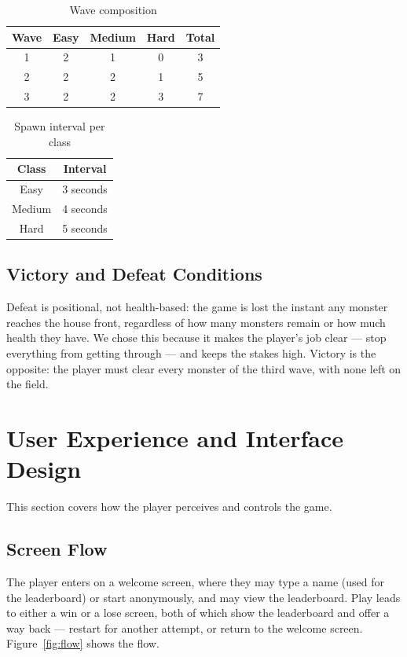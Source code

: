 \documentclass[12pt,a4paper]{report}
\begin{document}
\begin{table}[h]
\centering
\caption{Wave composition}
\label{tab:waves}
\begin{tabular}{|c|c|c|c|c|}
\hline
Wave & Easy & Medium & Hard & Total \\
\hline
1 & 2 & 1 & 0 & 3 \\
\hline
2 & 2 & 2 & 1 & 5 \\
\hline
3 & 2 & 2 & 3 & 7 \\
\hline
\end{tabular}
\end{table}

\begin{table}[h]
\centering
\caption{Spawn interval per class}
\label{tab:spawn}
\begin{tabular}{|c|c|}
\hline
Class & Interval \\
\hline
Easy   & 3 seconds \\
\hline
Medium & 4 seconds \\
\hline
Hard   & 5 seconds \\
\hline
\end{tabular}
\end{table}

\subsection{Victory and Defeat Conditions}

Defeat is positional, not health-based: the game is lost the instant any monster
reaches the house front, regardless of how many monsters remain or how much
health they have. We chose this because it makes the player's job clear --- stop
everything from getting through --- and keeps the stakes high. Victory is the
opposite: the player must clear every monster of the third wave, with none left
on the field.

\section{User Experience and Interface Design}

This section covers how the player perceives and controls the game.

\subsection{Screen Flow}

The player enters on a welcome screen, where they may type a name (used for the
leaderboard) or start anonymously, and may view the leaderboard. Play leads to
either a win or a lose screen, both of which show the leaderboard and offer a way
back --- restart for another attempt, or return to the welcome screen.
Figure~\ref{fig:flow} shows the flow.
\end{document}
